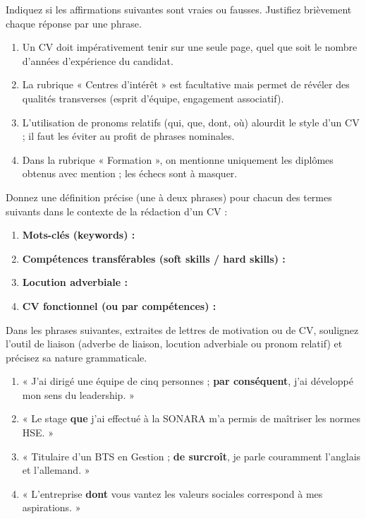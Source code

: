 \documentclass[11pt]{article}
\begin{document}
\begin{exercice}
Indiquez si les affirmations suivantes sont vraies ou fausses. Justifiez brièvement chaque réponse par une phrase.
\begin{enumerate}
\item Un CV doit impérativement tenir sur une seule page, quel que soit le nombre d'années d'expérience du candidat.
\item La rubrique « Centres d'intérêt » est facultative mais permet de révéler des qualités transverses (esprit d'équipe, engagement associatif).
\item L'utilisation de pronoms relatifs (qui, que, dont, où) alourdit le style d'un CV ; il faut les éviter au profit de phrases nominales.
\item Dans la rubrique « Formation », on mentionne uniquement les diplômes obtenus avec mention ; les échecs sont à masquer.
\end{enumerate}
\end{exercice}

\begin{exercice}
Donnez une définition précise (une à deux phrases) pour chacun des termes suivants dans le contexte de la rédaction d'un CV :
\begin{enumerate}
\item \textbf{Mots-clés (keywords) :}
\item \textbf{Compétences transférables (soft skills / hard skills) :}
\item \textbf{Locution adverbiale :}
\item \textbf{CV fonctionnel (ou par compétences) :}
\end{enumerate}
\end{exercice}

\begin{exercice}
Dans les phrases suivantes, extraites de lettres de motivation ou de CV, soulignez l'outil de liaison (adverbe de liaison, locution adverbiale ou pronom relatif) et précisez sa nature grammaticale.
\begin{enumerate}
\item « J'ai dirigé une équipe de cinq personnes ; \textbf{par conséquent}, j'ai développé mon sens du leadership. »
\item « Le stage \textbf{que} j'ai effectué à la SONARA m'a permis de maîtriser les normes HSE. »
\item « Titulaire d'un BTS en Gestion ; \textbf{de surcroît}, je parle couramment l'anglais et l'allemand. »
\item « L'entreprise \textbf{dont} vous vantez les valeurs sociales correspond à mes aspirations. »
\end{enumerate}
\end{exercice}
\end{document}
